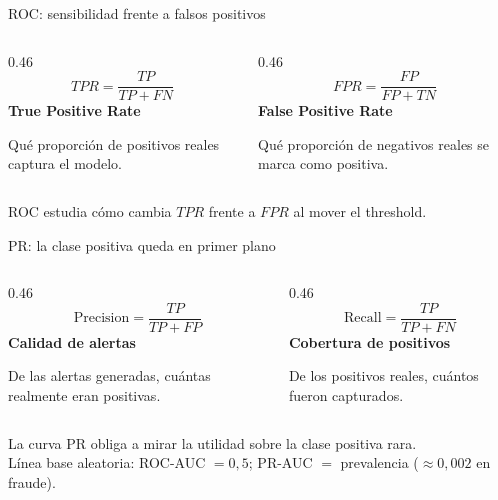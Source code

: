 \documentclass[aspectratio=169,12pt]{beamer}
\begin{document}
\begin{frame}{ROC: sensibilidad frente a falsos positivos}
  \begin{columns}[T]
    \begin{column}{0.46\textwidth}
      \[ TPR = \frac{TP}{TP + FN} \]
      \textbf{True Positive Rate}\par\vspace{6pt}
      Qué proporción de positivos reales captura el modelo.
    \end{column}
    \begin{column}{0.46\textwidth}
      \[ FPR = \frac{FP}{FP + TN} \]
      \textbf{False Positive Rate}\par\vspace{6pt}
      Qué proporción de negativos reales se marca como positiva.
    \end{column}
  \end{columns}
  \vspace{8pt}
  \begin{center}
    \large ROC estudia cómo cambia $TPR$ frente a $FPR$ al mover el threshold.
  \end{center}
\end{frame}

\begin{frame}{PR: la clase positiva queda en primer plano}
  \begin{columns}[T]
    \begin{column}{0.46\textwidth}
      \[ \mathrm{Precision} = \frac{TP}{TP + FP} \]
      \textbf{Calidad de alertas}\par\vspace{6pt}
      De las alertas generadas, cuántas realmente eran positivas.
    \end{column}
    \begin{column}{0.46\textwidth}
      \[ \mathrm{Recall} = \frac{TP}{TP + FN} \]
      \textbf{Cobertura de positivos}\par\vspace{6pt}
      De los positivos reales, cuántos fueron capturados.
    \end{column}
  \end{columns}
  \vspace{4pt}
  \begin{center}
    \large La curva PR obliga a mirar la utilidad sobre la clase positiva rara.\\[4pt]
    \small Línea base aleatoria: ROC-AUC $= 0{,}5$; PR-AUC $=$ prevalencia ($\approx 0{,}002$ en fraude).
  \end{center}
\end{frame}
\end{document}
